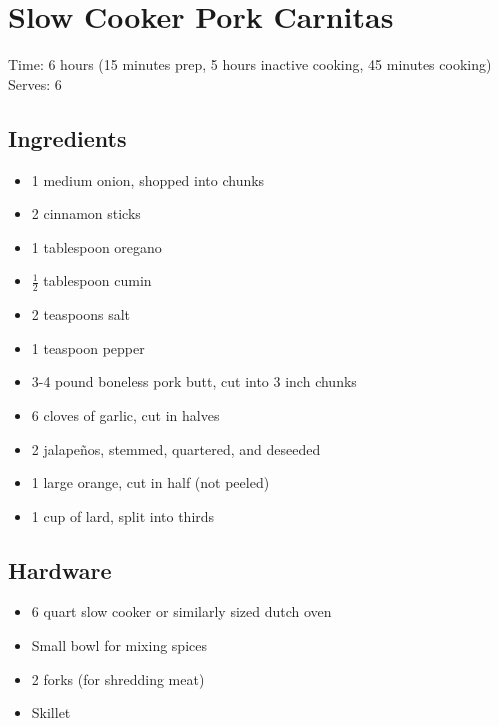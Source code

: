 \section{Slow Cooker Pork Carnitas}
\label{slowCookerPorkCarnitas}
Time: 6 hours (15 minutes prep, 5 hours inactive cooking, 45 minutes cooking)
Serves: 6

\begin{multicols}{2}
\subsection*{Ingredients}
\begin{itemize}
    \item 1 medium onion, shopped into chunks
    \item 2 cinnamon sticks
    \item 1 tablespoon oregano
    \item \( \frac{1}{2} \) tablespoon cumin
    \item 2 teaspoons salt
    \item 1 teaspoon pepper
    \item 3-4 pound boneless pork butt, cut into 3 inch chunks
    \item 6 cloves of garlic, cut in halves
    \item 2 jalapeños, stemmed, quartered, and deseeded
    \item 1 large orange, cut in half (not peeled)
    \item 1 cup of lard, split into thirds
\end{itemize}

\subsection*{Hardware}
\begin{itemize}
    \item 6 quart slow cooker or similarly sized dutch oven
    \item Small bowl for mixing spices
    \item 2 forks (for shredding meat)
    \item Skillet
\end{itemize}
\clearpage


\end{multicols}
